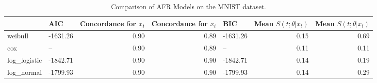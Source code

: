 \begin{table}
\caption{Comparison of AFR Models on the MNIST dataset.}
\label{tab:mnist}
\begin{tabular}{llrrlrr}
\toprule
 & AIC & Concordance for $x_t$ & Concordance for $x_i$ & BIC & Mean $S(t;\theta|x_{t})$ & Mean $S(t;\theta|x_{i})$ \\
\midrule
weibull & -1631.26 & 0.90 & 0.89 & -1631.26 & 0.15 & 0.69 \\
cox & -- & 0.90 & 0.89 & -- & 0.11 & 0.11 \\
log_logistic & -1842.71 & 0.90 & 0.90 & -1842.71 & 0.14 & 0.19 \\
log_normal & -1799.93 & 0.90 & 0.90 & -1799.93 & 0.14 & 0.29 \\
\bottomrule
\end{tabular}
\end{table}
